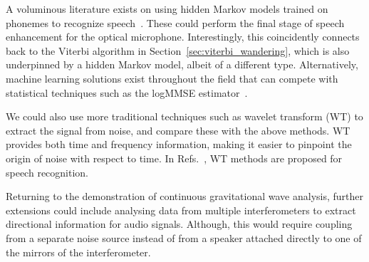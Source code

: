 \documentclass[paper-main.tex]{subfiles}
\begin{document}
A voluminous literature exists on using hidden Markov models trained on phonemes to recognize speech~\cite{HMM_english}. These could perform the final stage of speech enhancement for the optical microphone. Interestingly, this coincidently connects back to the Viterbi algorithm in Section~\ref{sec:viterbi_wandering}, which is also underpinned by a hidden Markov model, albeit of a different type. Alternatively, machine learning solutions exist throughout the field that can compete with statistical techniques such as the logMMSE estimator~\cite{SEGAN}.


We could also use more traditional techniques such as wavelet transform (WT) \citep{nason1995stationary} to extract the signal from noise, and compare these with the above methods. WT provides both time and frequency information, making it easier to pinpoint the origin of noise with respect to time. In Refs.~\cite{tufekci2000feature,agbinya1996discrete}, WT methods are proposed for speech recognition. 

Returning to the demonstration of continuous gravitational wave analysis, further extensions could include analysing data from multiple interferometers to extract directional information for audio signals. Although, this would require coupling from a separate noise source instead of from a speaker attached directly to one of the mirrors of the interferometer. 




\end{document}
